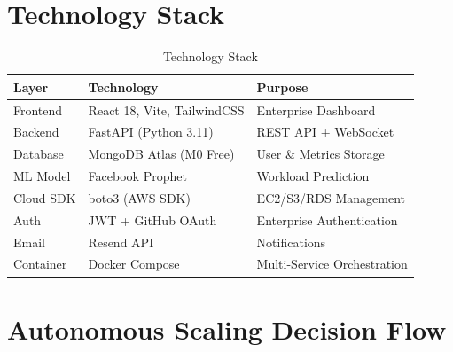 \documentclass[12pt,a4paper]{report}
\begin{document}
\section{Technology Stack}

\begin{table}[H]
\centering
\caption{Technology Stack}
\begin{tabular}{@{}lll@{}}
\toprule
\textbf{Layer} & \textbf{Technology} & \textbf{Purpose} \\
\midrule
Frontend & React 18, Vite, TailwindCSS & Enterprise Dashboard \\
Backend & FastAPI (Python 3.11) & REST API + WebSocket \\
Database & MongoDB Atlas (M0 Free) & User \& Metrics Storage \\
ML Model & Facebook Prophet & Workload Prediction \\
Cloud SDK & boto3 (AWS SDK) & EC2/S3/RDS Management \\
Auth & JWT + GitHub OAuth & Enterprise Authentication \\
Email & Resend API & Notifications \\
Container & Docker Compose & Multi-Service Orchestration \\
\bottomrule
\end{tabular}
\end{table}

\section{Autonomous Scaling Decision Flow}
\end{document}
